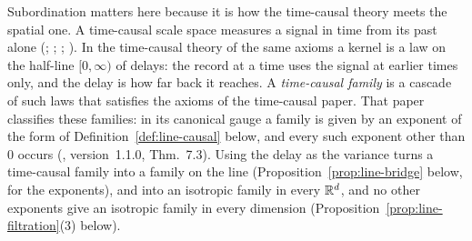 Subordination matters here because it is how the time-causal theory meets the spatial one. A
time-causal scale space measures a signal in time from its past alone
(; ;
; ). In
the time-causal theory of the same axioms  a kernel is a law on
the half-line $[0,\infty)$ of delays: the record at
a time uses the signal at earlier times only, and the delay is how far back it reaches. A
\emph{time-causal family} is a cascade of such laws that satisfies the axioms of the time-causal
paper. That paper classifies these families: in its canonical gauge a family is given by an
exponent of the form of Definition~\ref{def:line-causal} below, and every such exponent other
than $0$ occurs (, version~1.1.0, Thm.~7.3). Using the delay as
the variance turns a time-causal
family into a family on the line (Proposition~\ref{prop:line-bridge} below, for the exponents),
and into an isotropic family in every $\mathbb{R}^d$, and no other exponents give an isotropic family in
every dimension (Proposition~\ref{prop:line-filtration}(3) below).

